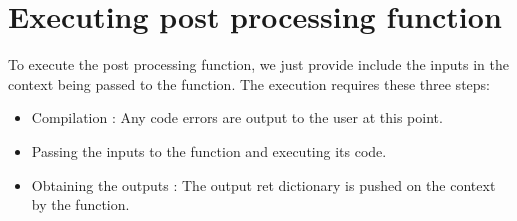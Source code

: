 \documentclass[letterpaper,10pt,english]{sphinxmanual}
\begin{document}
\begin{sphinxVerbatim}[commandchars=\\\{\}]
 
      \PYG{p}{[}\PYG{p}{]} \PYG{p}{[}\PYG{p}{]}
     \PYG{p}{[}\PYG{p}{]} 
      \PYG{p}{[}\PYG{p}{]}
      \PYG{p}{[}\PYG{p}{]}
       
        \PYG{p}{[}\PYG{p}{]}\PYG{p}{[}\PYG{p}{]}
        \PYG{p}{[}\PYG{p}{]}\PYG{p}{[}\PYG{p}{]}

      
    \PYG{p}{[}\PYG{p}{]}  
    \PYG{p}{[}\PYG{p}{]}  
     
\end{sphinxVerbatim}


\section{Executing post processing function}
\label{\detokenize{postprocessing:executing-post-processing-function}}
To execute the post processing function, we just provide include the inputs in the context being passed to the function. The execution requires these three steps:
\begin{itemize}
\item {} 
Compilation : Any code errors are output to the user at this point.

\item {} 
Passing the inputs to the function and executing its code.

\item {} 
Obtaining the outputs : The output ret dictionary is pushed on the context by the function.

\end{itemize}
\end{document}
